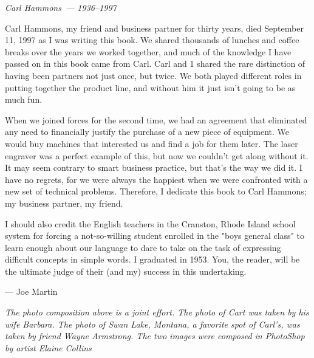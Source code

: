 \secdown
{}\secdown

\textit{Carl Hammons\ --- 1936--1997}
\bigskip

Carl Hammons, my friend and business partner for thirty years, died September
11, 1997 as I was writing this book. We shared thousands of lunches and coffee
breaks over the years we worked together, and much of the knowledge I have
passed on in this book came from Carl. Carl and 1 shared the rare distinction of
having been partners not just once, but twice. We both played different roles in
putting together the product line, and without him it just isn't going to be as
much fun.

When we joined forces for the second time, we had an agreement that eliminated
any need to financially justify the purchase of a new piece of equipment. We
would buy machines that interested us and find a job for them later. The laser
engraver was a perfect example of this, but now we couldn't get along without
it. It may seem contrary to smart business practice, but that's the way we did
it. I have no regrets, for we were always the happiest when we were confronted
with a new set of technical problems. Therefore, I dedicate this book to Carl
Hammons; my business partner, my friend.

\bigskip
I should also credit the English teachers in the Cranston, Rhode Island school
system for forcing a not-so-willing student enrolled in the "boys general class"
to learn enough about our language to dare to take on the task of expressing
difficult concepts in simple words. I graduated in 1953. You, the reader, will
be the ultimate judge of their (and my) success in this undertaking.

\bigskip
--- Joe Martin

\bigskip
\textit{The photo composition above is a joint effort. The photo of Cart was
taken by his wife Barbara. The photo of Swan Lake, Montana, a favorite spot of
Carl's, was taken by friend Wayne Armstrong. The two images were composed in
PhotoShop by artist Elaine Collins}

\secup
\secup
